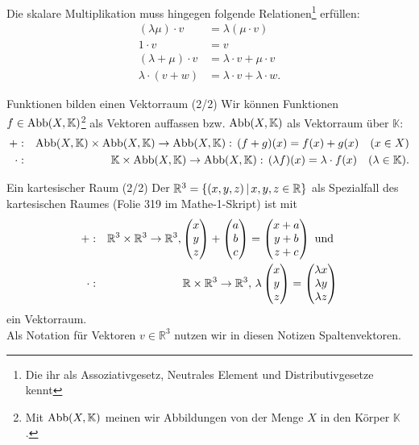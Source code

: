 Die skalare Multiplikation muss hingegen folgende Relationen\footnote{Die ihr als Assoziativgesetz, Neutrales Element und Distributivgesetze kennt} erfüllen:
\begin{align*}
    (\lambda\mu)\cdot v&=\lambda(\mu\cdot v)\\
    1\cdot v&= v\\
    (\lambda+\mu)\cdot v&=\lambda \cdot v+\mu \cdot v\\
    \lambda\cdot(v+w)&=\lambda \cdot v+\lambda \cdot w.
\end{align*}
\begin{Beispiel}
{Funktionen bilden einen Vektorraum (2/2)}
Wir können Funktionen $f\in \text{Abb}(X,\mathbb{K})$\footnote{Mit $\text{Abb}(X,\mathbb{K})$ meinen wir Abbildungen von der Menge $X$ in den Körper $\mathbb{K}$.} als Vektoren auffassen bzw. $\text{Abb}(X,\mathbb{K})$ als Vektorraum über $\mathbb{K}$:
\begin{eqnarray*}
+:&&\text{Abb}(X,\mathbb{K})\times \text{Abb}(X,\mathbb{K})\to \text{Abb}(X,\mathbb{K}):\,(f+g)(x)=f(x)+g(x)\quad (x\in X)\\
\cdot:&&\mathbb{K}\times \text{Abb}(X,\mathbb{K})\to \text{Abb}(X,\mathbb{K}):\,(\lambda f)(x)=\lambda\cdot f(x)\quad (\lambda\in\mathbb{K}).
\end{eqnarray*}
\end{Beispiel}
\begin{Beispiel}{Ein kartesischer Raum (2/2)}
Der $\mathbb{R}^3=\{(x,y,z)\,|\, x,y,z\in\mathbb{R}\}$ als Spezialfall des kartesischen Raumes (Folie 319 im Mathe-1-Skript) ist mit
\begin{eqnarray*}
+:&&\mathbb{R}^3\times\mathbb{R}^3\to\mathbb{R}^3, \begin{pmatrix}x\\y\\z\end{pmatrix}+\begin{pmatrix}a\\b\\c\end{pmatrix}=\begin{pmatrix}x+a\\y+b\\z+c\end{pmatrix}\text{ und }\\
\cdot:&&\mathbb{R}\times\mathbb{R}^3\to\mathbb{R}^3,\,\lambda\begin{pmatrix}x\\y\\z\end{pmatrix}=\begin{pmatrix}\lambda x\\\lambda y\\\lambda z\end{pmatrix}
\end{eqnarray*}
ein Vektorraum.\\
Als Notation für Vektoren $v\in\mathbb{R}^3$ nutzen wir in diesen Notizen Spaltenvektoren.
\end{Beispiel}
